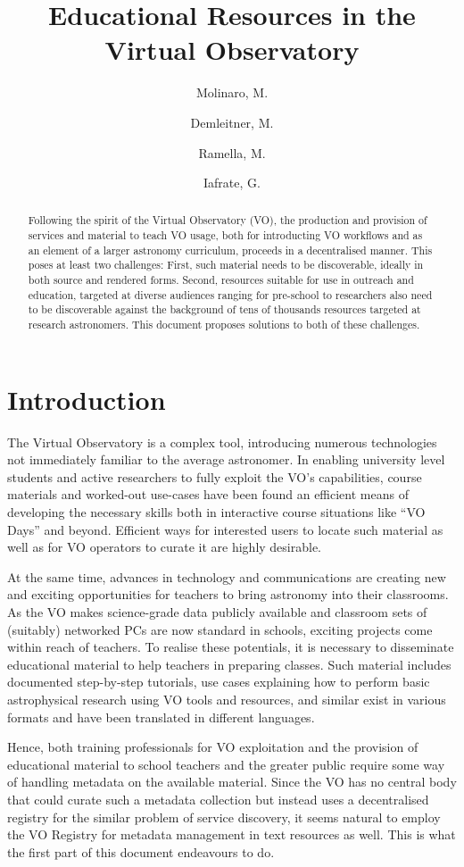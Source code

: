 \documentclass{ivoa}
\author{Molinaro, M.}
\author{Demleitner, M.}
\author{Ramella, M.}
\author{Iafrate, G.}
\title{Educational Resources in the Virtual Observatory}
\begin{document}
\begin{abstract}
Following the spirit of the Virtual Observatory (VO), the production and
provision of services and material to teach VO usage, both for
introducting VO workflows and as an element of a larger astronomy
curriculum, proceeds in a decentralised manner.  This poses at least two
challenges: First, such material needs to be discoverable, ideally in
both source and rendered forms.  Second, resources suitable for use in
outreach and education, targeted at diverse audiences ranging for
pre-school to researchers also need to be discoverable against the
background of tens of thousands resources targeted at research
astronomers.  This document proposes solutions to both of these
challenges.
\end{abstract}


\section{Introduction}

The Virtual Observatory is a complex tool, introducing numerous
technologies not immediately familiar to the average astronomer.
In enabling university level students
and active researchers to fully exploit the VO's capabilities, course
materials and worked-out use-cases have been found an efficient means of
developing the necessary skills both in interactive course situations
like ``VO Days'' and beyond.  
Efficient ways for interested users to locate such
material as well as for VO operators to curate it are highly desirable.

At the same time, advances in technology and 
communications are creating new and exciting 
opportunities for teachers to bring astronomy into their 
classrooms.  As the VO makes science-grade data publicly available and
classroom sets of (suitably) networked PCs are now standard in schools,
exciting projects come within reach of teachers.  To realise these
potentials,
it is necessary to disseminate educational material to help teachers
in preparing classes.  Such material includes documented step-by-step
tutorials, use cases explaining how to perform basic astrophysical research 
using VO tools and resources, and similar exist in various formats and
have been translated in different languages.

Hence, both training professionals for VO exploitation and the provision
of educational material to school teachers and the greater public
require some way of handling metadata on the available material.  Since
the VO has no central body that could curate such a metadata collection
but instead uses a decentralised registry for the similar problem of
service discovery, it seems natural to employ the VO Registry for
metadata management in text resources as well.  This is what the first
part of this document endeavours to do.
\end{document}
